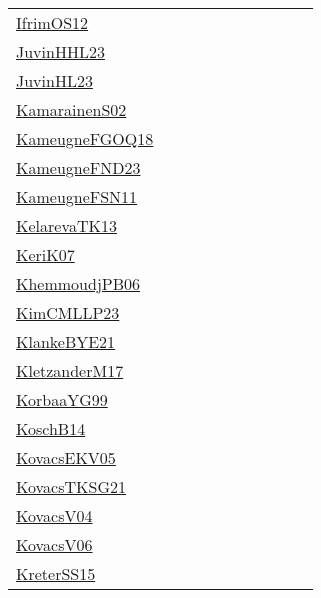 {\begin{longtable}{p{3cm}p{4cm}p{2cm}p{2cm}p{2cm}p{2cm}p{2cm}p{2cm}p{2cm}p{2cm}}
\href{papers/IfrimOS12.pdf}{IfrimOS12}~\cite{IfrimOS12} &  &  &  &  &  &  &  &  & \\
\href{papers/JuvinHHL23.pdf}{JuvinHHL23}~\cite{JuvinHHL23} &  &  &  &  &  &  &  &  & \\
\href{papers/JuvinHL23.pdf}{JuvinHL23}~\cite{JuvinHL23} &  &  &  &  &  &  &  &  & \\
\href{papers/KamarainenS02.pdf}{KamarainenS02}~\cite{KamarainenS02} &  &  &  &  &  &  &  &  & \\
\href{papers/KameugneFGOQ18.pdf}{KameugneFGOQ18}~\cite{KameugneFGOQ18} &  &  &  &  &  &  &  &  & \\
\href{papers/KameugneFND23.pdf}{KameugneFND23}~\cite{KameugneFND23} &  &  &  &  &  &  &  &  & \\
\href{papers/KameugneFSN11.pdf}{KameugneFSN11}~\cite{KameugneFSN11} &  &  &  &  &  &  &  &  & \\
\href{papers/KelarevaTK13.pdf}{KelarevaTK13}~\cite{KelarevaTK13} &  &  &  &  &  &  &  &  & \\
\href{papers/KeriK07.pdf}{KeriK07}~\cite{KeriK07} &  &  &  &  &  &  &  &  & \\
\href{papers/KhemmoudjPB06.pdf}{KhemmoudjPB06}~\cite{KhemmoudjPB06} &  &  &  &  &  &  &  &  & \\
\href{papers/KimCMLLP23.pdf}{KimCMLLP23}~\cite{KimCMLLP23} &  &  &  &  &  &  &  &  & \\
\href{papers/KlankeBYE21.pdf}{KlankeBYE21}~\cite{KlankeBYE21} &  &  &  &  &  &  &  &  & \\
\href{papers/KletzanderM17.pdf}{KletzanderM17}~\cite{KletzanderM17} &  &  &  &  &  &  &  &  & \\
\href{papers/KorbaaYG99.pdf}{KorbaaYG99}~\cite{KorbaaYG99} &  &  &  &  &  &  &  &  & \\
\href{papers/KoschB14.pdf}{KoschB14}~\cite{KoschB14} &  &  &  &  &  &  &  &  & \\
\href{papers/KovacsEKV05.pdf}{KovacsEKV05}~\cite{KovacsEKV05} &  &  &  &  &  &  &  &  & \\
\href{papers/KovacsTKSG21.pdf}{KovacsTKSG21}~\cite{KovacsTKSG21} &  &  &  &  &  &  &  &  & \\
\href{papers/KovacsV04.pdf}{KovacsV04}~\cite{KovacsV04} &  &  &  &  &  &  &  &  & \\
\href{papers/KovacsV06.pdf}{KovacsV06}~\cite{KovacsV06} &  &  &  &  &  &  &  &  & \\
\href{papers/KreterSS15.pdf}{KreterSS15}~\cite{KreterSS15} &  &  &  &  &  &  &  &  & \\

\end{longtable}}
